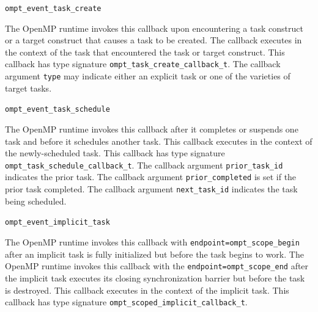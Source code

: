 \documentclass{article}
\newcommand{\descheader}[1]{{\needspace{3\baselineskip}\vspace{1em}\noindent \fbox{#1}}}
\begin{document}
\begin{description}

\item \verb|ompt_event_task_create|
 
The OpenMP runtime invokes this callback
upon encountering a task construct or a target construct that causes a task to be created. 
The callback executes in the context of
the task that encountered the task or target construct.
This callback has type signature \verb|ompt_task_create_callback_t|.
The callback argument \verb|type| may indicate either an explicit task or one of the varieties of target tasks.

\item \verb|ompt_event_task_schedule|

 The OpenMP runtime invokes this callback after it
 completes or suspends one task and before it schedules another task.  This
 callback executes in the context of the newly-scheduled task.  
   This callback has type signature \verb|ompt_task_schedule_callback_t|. 
  The callback argument \verb|prior_task_id| indicates the prior task.
  The callback argument \verb|prior_completed| is set if the prior task completed.
  The callback argument \verb|next_task_id| indicates the task being scheduled. 

\item \verb|ompt_event_implicit_task|

      The OpenMP runtime invokes this callback with \verb|endpoint=|\verb|ompt_scope_begin| after an
   implicit task is fully initialized but before the task begins to work.
   The OpenMP runtime invokes this callback with the \verb|endpoint=|\verb|ompt_scope_end| after the implicit
   task executes its closing synchronization barrier but before
   the task is destroyed.
   This callback executes in the context of the implicit task.
     This callback has type signature \verb|ompt_scoped_implicit_callback_t|. 
   
\end{description}

\descheader{Target Regions}
\end{document}
